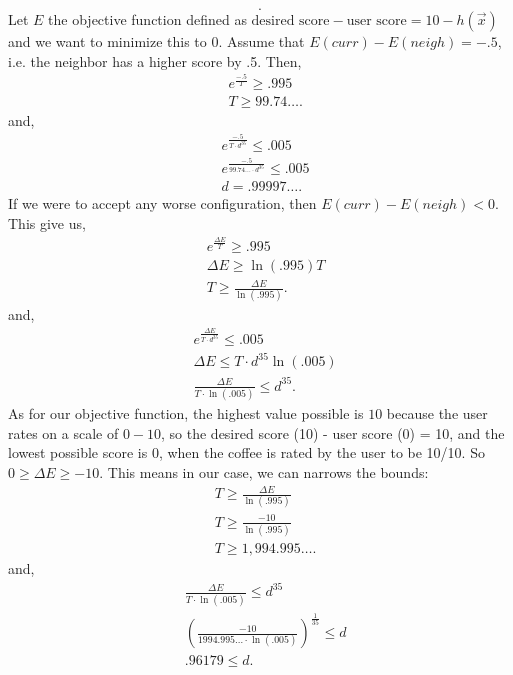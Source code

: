 \documentclass[a4paper]{article}
\begin{document}
\begin{enumerate}
\[    .\]
    Let $E$ the  objective function defined as $\text{desired score} - \text{user score} = 10 - h(\vec{x})$ and we want to
    minimize this to 0. Assume that $E(curr) - E(neigh) = -.5$, i.e. the neighbor has a higher score by .5. Then,
    \begin{align*}
      & e^{\frac{-.5}{T}} \geq .995 \\
      & T \geq 99.74\ldots 
    .\end{align*}
    and,
    \begin{align*}
     & e^{\frac{-.5}{T \cdot d^{35}}} \leq .005 \\
     & e^{\frac{-.5}{99.74\ldots \cdot d^{35}}} \leq .005 \\
     & d = .99997\ldots 
    .\end{align*} 
    If we were to accept any worse configuration, then $E(curr) - E(neigh) < 0$. This give us,
     \begin{align*}
     & e^{\frac{\Delta E}{T}} \geq .995 \\
     & \Delta E \geq \ln(.995) T \\
     & T \geq \frac{\Delta E}{\ln(.995)} 
    .\end{align*}
    and, 
    \begin{align*}
      &  e^{\frac{\Delta E}{T \cdot d^{35}}} \leq .005 \\
      & \Delta E \leq T \cdot d^{35} \ln(.005) \\
      &  \frac{\Delta E}{T \cdot \ln(.005)} \leq d^{35}
    .\end{align*}
    As for our objective function, the highest value possible is $10$ because the user rates on a scale of $0-10$,
    so the desired score (10) - user score (0) = 10, and the lowest possible score is 0, when the coffee is rated
    by the user to be 10/10. So $0 \geq \Delta E \geq -10$. This means in our case, we can narrows the bounds:
    \begin{align*} 
     & T \geq \frac{\Delta E}{\ln(.995)} \\
     & T \geq \frac{-10}{\ln(.995)} \\
     & T \geq 1,994.995\ldots
    .\end{align*} 
    and,
    \begin{align*}
      & \frac{\Delta E}{T \cdot \ln(.005)} \leq d^{35} \\
      & (\frac{-10}{1994.995\ldots \cdot \ln(.005)})^{\frac{1}{35}} \leq d \\
      & .96179 \leq d
    .\end{align*}
\end{enumerate}
\end{document}
